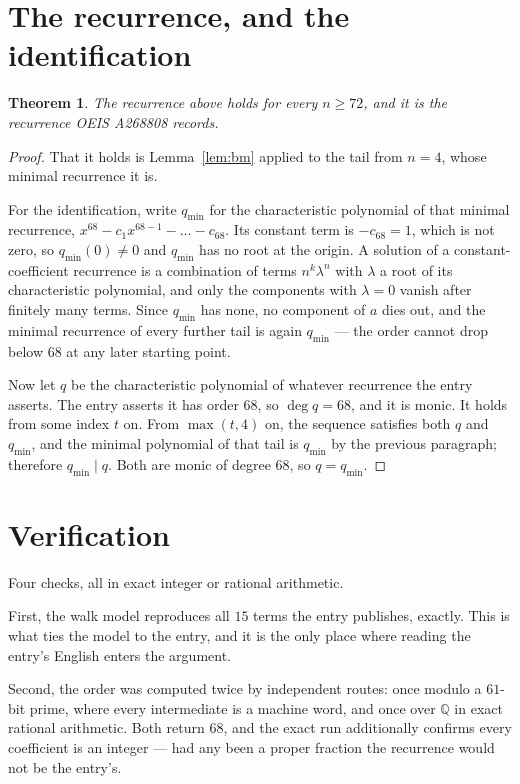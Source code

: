 \documentclass[11pt,a4paper]{article}
\theoremstyle{plain}
\newtheorem{theorem}{Theorem}
\theoremstyle{definition}
\begin{document}
\section{The recurrence, and the identification}

\begin{theorem}
The recurrence above holds for every $n\ge72$, and it is the recurrence OEIS A268808 records.
\end{theorem}

\begin{proof}
That it holds is Lemma~\ref{lem:bm} applied to the tail from $n=4$, whose minimal
recurrence it is.

For the identification, write $q_{\min}$ for the characteristic polynomial of that minimal
recurrence, $x^{68}-c_1x^{68-1}-\dots-c_{68}$. Its constant term is
$-c_{68}=1$, which is not zero, so $q_{\min}(0)\neq0$ and $q_{\min}$ has no
root at the origin. A solution of a constant-coefficient recurrence is a combination of terms
$n^{k}\lambda^{n}$ with $\lambda$ a root of its characteristic polynomial, and only the
components with $\lambda=0$ vanish after finitely many terms. Since $q_{\min}$ has none, no
component of $a$ dies out, and the minimal recurrence of every further tail is again
$q_{\min}$ --- the order cannot drop below $68$ at any later starting point.

Now let $q$ be the characteristic polynomial of whatever recurrence the entry asserts. The
entry asserts it has order $68$, so $\deg q=68$, and it is monic. It holds from some
index $t$ on. From $\max(t,4)$ on, the sequence satisfies both $q$ and $q_{\min}$, and
the minimal polynomial of that tail is $q_{\min}$ by the previous paragraph; therefore
$q_{\min}\mid q$. Both are monic of degree $68$, so $q=q_{\min}$.
\end{proof}

\section{Verification}

Four checks, all in exact integer or rational arithmetic.

First, the walk model reproduces all $15$ terms the entry publishes, exactly. This is
what ties the model to the entry, and it is the only place where reading the entry's English
enters the argument.

Second, the order was computed twice by independent routes: once modulo a $61$-bit prime, where
every intermediate is a machine word, and once over $\mathbb{Q}$ in exact rational arithmetic.
Both return $68$, and the exact run additionally confirms every coefficient is an integer
--- had any been a proper fraction the recurrence would not be the entry's.
\end{document}
